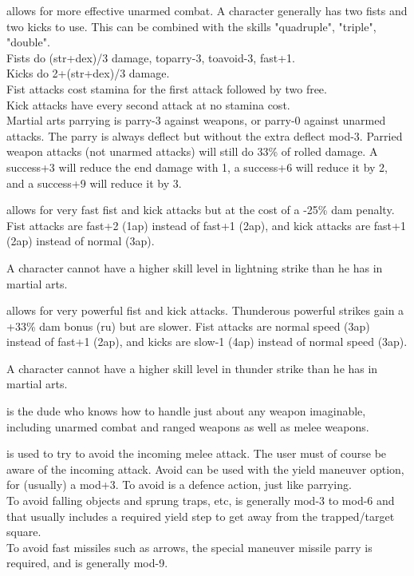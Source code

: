  allows for more effective unarmed combat. A character generally has two fists and two kicks to use. This can be combined with the skills "quadruple", "triple", "double". \\
Fists do (str+dex)/3 damage, toparry-3, toavoid-3, fast+1. \\
Kicks do 2+(str+dex)/3 damage.\\
Fist attacks cost stamina for the first attack followed by two free.\\
Kick attacks have every second attack at no stamina cost. \\
Martial arts parrying is parry-3 against weapons, or parry-0 against unarmed attacks. The parry is always deflect but without the extra deflect mod-3. Parried weapon attacks (not unarmed attacks) will still do 33\% of rolled damage. A success+3 will reduce the end damage with 1, a success+6 will reduce it by 2, and a success+9 will reduce it by 3.

 allows for very fast fist and kick attacks but at the cost of a -25\% dam penalty. Fist attacks are fast+2 (1ap) instead of fast+1 (2ap), and kick attacks are fast+1 (2ap) instead of normal (3ap).

A character cannot have a higher skill level in lightning strike than he has in martial arts.

 allows for very powerful fist and kick attacks.  Thunderous powerful strikes gain a +33\% dam bonus (ru) but are slower. Fist attacks are normal speed (3ap) instead of fast+1 (2ap), and kicks are slow-1 (4ap) instead of normal speed (3ap).

A character cannot have a higher skill level in thunder strike than he has in martial arts.


 is the dude who knows how to handle just about any weapon imaginable, including unarmed combat and ranged weapons as well as melee weapons.


 is used to try to avoid the incoming melee attack. The user must of course be aware of the incoming attack. Avoid can be used with the yield maneuver option, for (usually) a mod+3. To avoid is a defence action, just like parrying. \\
To avoid falling objects and sprung traps, etc, is generally mod-3 to mod-6 and that usually includes a required yield step to get away from the trapped/target square. \\
To avoid fast missiles such as arrows, the special maneuver missile parry is required, and is generally mod-9.


